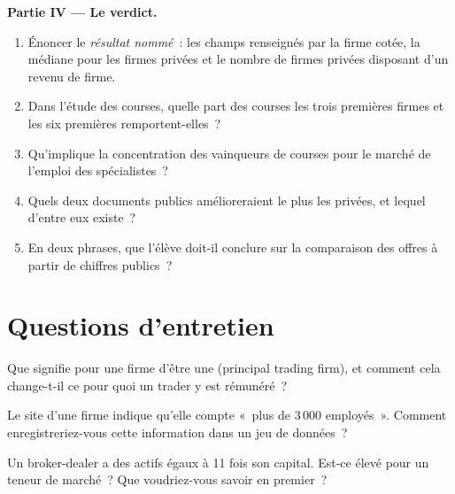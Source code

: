 \begin{problem}
\medskip\noindent\textbf{Partie IV --- Le verdict.}
\begin{enumerate}[resume]
\item Énoncer le \emph{résultat nommé}~: les champs renseignés par la firme cotée, la médiane pour les firmes privées et le
nombre de firmes privées disposant d'un revenu de firme.
\item Dans l'étude des courses, quelle part des courses les trois premières firmes et les six premières remportent-elles~?
\item Qu'implique la concentration des vainqueurs de courses pour le marché de l'emploi des spécialistes~?
\item Quels deux documents publics amélioreraient le plus les  privées, et lequel d'entre eux existe~?
\item En deux phrases, que l'élève doit-il conclure sur la comparaison des offres à partir de chiffres publics~?
\end{enumerate}
\end{problem}

\section{Questions d'entretien}

\begin{interviewq}\label{iq:in:proprietary-market-makers-and-high-frequency-firms:1}
Que signifie pour une firme d'être une  (principal trading firm), et comment cela change-t-il
ce pour quoi un trader y est rémunéré~?
\end{interviewq}

\begin{interviewq}\label{iq:in:proprietary-market-makers-and-high-frequency-firms:2}
Le site d'une firme indique qu'elle compte «~plus de 3\,000 employés~». Comment enregistreriez-vous cette information dans un jeu de données~?
\end{interviewq}

\begin{interviewq}\label{iq:in:proprietary-market-makers-and-high-frequency-firms:3}
Un broker-dealer a des actifs égaux à 11 fois son capital. Est-ce élevé pour un teneur de marché~? Que voudriez-vous savoir en premier~?
\end{interviewq}

